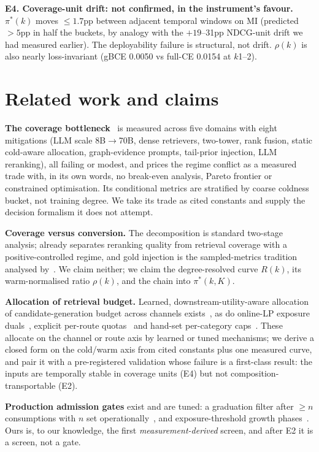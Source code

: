 \documentclass[sigconf,anonymous,review]{acmart}
\begin{document}
\textbf{E4. Coverage-unit drift: not confirmed, in the instrument's favour.} $\pi^*(k)$ moves $\le 1.7$pp between adjacent temporal windows on MI (predicted $>5$pp in half the buckets, by analogy with the $+19$--31pp NDCG-unit drift we had measured earlier). The deployability failure is structural, not drift. $\rho(k)$ is also nearly loss-invariant (gBCE 0.0050 vs full-CE 0.0154 at $k$1--2).

\section{Related work and claims}
\textbf{The coverage bottleneck}~\cite{bottleneck} is measured across five domains with eight mitigations (LLM scale 8B$\to$70B, dense retrievers, two-tower, rank fusion, static cold-aware allocation, graph-evidence prompts, tail-prior injection, LLM reranking), all failing or modest, and prices the regime conflict as a measured trade with, in its own words, no break-even analysis, Pareto frontier or constrained optimisation. Its conditional metrics are stratified by coarse coldness bucket, not training degree. We take its trade as cited constants and supply the decision formalism it does not attempt.

\textbf{Coverage versus conversion.} The decomposition is standard two-stage analysis; \cite{dualregime} already separates reranking quality from retrieval coverage with a positive-controlled regime, and gold injection is the sampled-metrics tradition analysed by~\cite{sampled}. We claim neither; we claim the degree-resolved curve $R(k)$, its warm-normalised ratio $\rho(k)$, and the chain into $\pi^*(k,K)$.

\textbf{Allocation of retrieval budget.} Learned, downstream-utility-aware allocation of candidate-generation budget across channels exists~\cite{capts}, as do online-LP exposure duals~\cite{mirec}, explicit per-route quotas~\cite{onerec} and hand-set per-category caps~\cite{realroute}. These allocate on the channel or route axis by learned or tuned mechanisms; we derive a closed form on the cold/warm axis from cited constants plus one measured curve, and pair it with a pre-registered validation whose failure is a first-class result: the inputs are temporally stable in coverage units (E4) but not composition-transportable (E2).

\textbf{Production admission gates} exist and are tuned: a graduation filter after $\ge n$ consumptions with $n$ set operationally~\cite{freshfunnel}, and exposure-threshold growth phases~\cite{kuaishou}. Ours is, to our knowledge, the first \emph{measurement-derived} screen, and after E2 it is a screen, not a gate.
\end{document}
